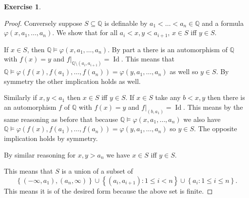 \documentclass{article}
\newcommand{\Q}{\mathbb{Q}}
\DeclareMathOperator{\Id}{Id}
\newcommand{\set}[1]{\left\{#1\right\}}
\newcommand{\setwith}[2]{\left\{#1:#2\right\}}
\theoremstyle{definition}
\newtheorem{question}{Exercise}
\begin{document}
\begin{question}
\begin{enumerate}[(a)]
\begin{proof}
                  Conversely suppose \(S\subseteq\Q\) is definable by
                  \(a_{1}<\ldots<a_{n}\in\Q\) and a formula
                  \(\varphi(x,a_{1},\ldots,a_{n})\). We show that for all
                  \(a_{i}<x,y<a_{i+1}\), \(x\in S\) iff \(y\in S\).

                  If \(x\in S\), then
                  \(\Q\models\varphi(x,a_{1},\ldots,a_{n})\). By part a there is
                  an automorphism of \(\Q\) with \(f(x)=y\) and
                  \(f|_{\Q\setminus(a_{i},a_{i+1})}=\Id\). This means that
                  \(\Q\models\varphi(f(x),f(a_{1}),\ldots,f(a_{n}))=\varphi(y,a_{1},\ldots,a_{n})\)
                  as well so \(y\in S\). By symmetry the other implication holds
                  as well.

                  Similarly if \(x,y<a_{1}\) then \(x\in S\) iff \(y\in S\). If
                  \(x\in S\) take any \(b<x,y\) then there is an automorphism
                  \(f\) of \(\Q\) with \(f(x)=y\) and \(f|_{(b,a_{1})}=\Id\).
                  This means by the same reasoning as before that because
                  \(\Q\models\varphi(x,a_{1},\ldots,a_{n})\) we also have
                  \(\Q\models\varphi(f(x),f(a_{1}),\ldots,f(a_{n}))=\varphi(y,a_{1},\ldots,a_{n})\)
                  so \(y\in S\). The opposite implication holds by symmetry.

                  By similar reasoning for \(x,y>a_{n}\) we have \(x\in S\) iff
                  \(y\in S\).

                  This means that \(S\) is a union of a subset of
                  \[
                      \set{(-\infty,a_{1}),(a_{n},\infty)}\cup\setwith{(a_{i},a_{i+1})}{1\leq i<n}\cup\setwith{a_{i}}{1\leq i\leq n}.
                  \]
                  This means it is of the desired form because the above set is
                  finite.
              \end{proof}
    \end{enumerate}
\end{question}
\end{document}
